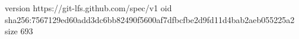 version https://git-lfs.github.com/spec/v1
oid sha256:7567129ed60add3dc6bb82490f5600af7dfbcfbe2d9fd11d4bab2aeb055225a2
size 693
